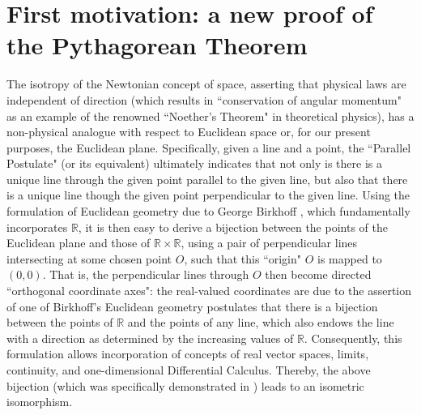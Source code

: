 \documentclass{amsart}
\numberwithin{equation}{section}
\theoremstyle{definition}
\numberwithin{theorem}{section}
\begin{document}
\vspace{.5cm}

\appendix

 \section{First motivation: a  new proof of the Pythagorean Theorem}    The isotropy of the Newtonian concept of space, asserting that physical laws are independent of direction (which results in ``conservation of angular momentum" as an example of the renowned ``Noether's Theorem" in theoretical physics), has a non-physical analogue with respect to Euclidean space or, for our present purposes, the Euclidean plane.  Specifically, given a line and a point, the ``Parallel Postulate" (or its equivalent) ultimately indicates that not only is there is a unique line through the given point parallel to the given line, but also that there is a unique line though the given point perpendicular to the given line.  Using the formulation of Euclidean geometry due to George Birkhoff \cite{birkhoff:1932}, which fundamentally incorporates $\mathbb{R}$, it is then easy to derive a bijection between the points of the Euclidean plane and those of $\mathbb{R}\times\mathbb{R}$, using a pair of perpendicular lines intersecting at some chosen point $O$, such that this ``origin" $O$ is mapped to $(0,0)$.  That is, the perpendicular lines through $O$ then become directed ``orthogonal coordinate axes": the real-valued coordinates are due to the assertion of one of Birkhoff's Euclidean geometry postulates that there is a bijection between the points of $\mathbb{R}$ and the points of any line, which also endows the line with a direction as determined by the increasing values of $\mathbb{R}$.  Consequently, this formulation allows incorporation of concepts of real vector spaces, limits, continuity, and one-dimensional Differential Calculus.  Thereby, the above bijection (which was specifically demonstrated in \cite{birkhoff:1932}) leads to an isometric isomorphism. 
\end{document}
